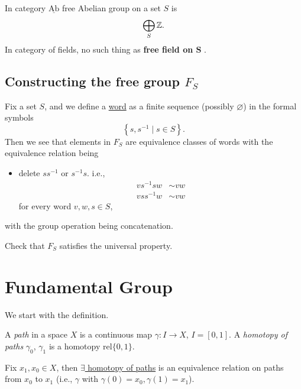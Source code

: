 \begin{eg}
	In category \(\underline{\mathrm{Ab}}\) free Abelian group on a set \(S\) is
	\[
		\bigoplus_S \mathbb{\MakeUppercase{z}}.
	\]
	In category of fields, no such thing as \textbf{free field on \(\bm{S} \) }.
\end{eg}

\subsection{Constructing the free group \(F_S\)}
Fix a set \(S\), and we define a \underline{word} as a finite sequence (possibly \(\varnothing \))
in the formal symbols
\[
	\left\{s, s ^{-1} \mid s\in S\right\}.
\]
Then we see that elements in \(F_S\) are equivalence classes of words with the equivalence relation being
\begin{itemize}
	\item delete \(s s ^{-1} \) or \(s ^{-1} s\). i.e.,
	      \[
		      \begin{split}
			      vs ^{-1} s w&\sim vw\\
			      v s s ^{-1}  w &\sim vw
		      \end{split}
	      \]
	      for every word \(v, w, s\in S\),
\end{itemize}
with the group operation being concatenation.

\begin{exercise}
	Check that \(F_S\) satisfies the universal property.
\end{exercise}

\section{Fundamental Group}
We start with the definition.
\begin{definition}[Path]
	A \emph{path} in a space \(X\) is a continuous map \(\gamma\colon I\to X\), \(I = [0, 1]\).
	A \emph{homotopy of paths} \(\gamma_0\), \(\gamma_1\) is a homotopy \(\mathrm{rel} \{0, 1\}\).
	\begin{figure}[H]
		\centering
		\label{fig:def:homotopy-of-paths}
	\end{figure}
\end{definition}
\begin{eg}
	Fix \(x_1, x_0\in X\), then \underline{\(\exists\) homotopy of paths} is an equivalence relation on paths
	from \(x_0\) to \(x_1\) (i.e., \(\gamma\) with \(\gamma(0)=x_0, \gamma(1)=x_1\)).
\end{eg}

